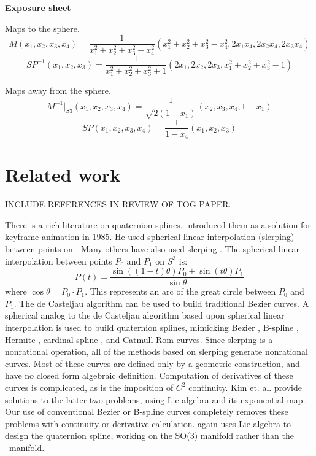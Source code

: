 \documentclass[11pt]{article}
\begin{document}
{\bf Exposure sheet}

Maps to the sphere.
\[
	M(x_1,x_2,x_3,x_4) =
	\frac{1}{x_1^2 + x_2^2 + x_3^2 + x_4^2}
	(x_1^2 + x_2^2 + x_3^2 - x_4^2, 2x_1x_4, 2x_2x_4, 2x_3x_4)
\]
\[
SP^{-1}(x_1,x_2,x_3) = \frac{1}{x_1^2 + x_2^2 + x_3^2 + 1} 
                       (2x_1, 2x_2, 2x_3, x_1^2+x_2^2+x_3^2 - 1)
\]

Maps away from the sphere.
\[
M^{-1}|_{S3}(x_1,x_2,x_3,x_4) = \frac{1}{\sqrt{2(1-x_1)}}(x_2,x_3,x_4,1-x_1)
\]
\[
SP(x_1,x_2,x_3,x_4) = \frac{1}{1-x_4} (x_1,x_2,x_3)
\]

\clearpage

\section{Related work}
\label{sec:prevwork}


INCLUDE REFERENCES IN REVIEW OF TOG PAPER.

There is a rich literature on quaternion splines.
\cite{shoemake85} introduced them as a solution 
for keyframe animation in 1985.
He used spherical linear interpolation (slerping) between points on .
Many others have also used slerping 
\cite{duff85,pletinckx89,schlag91,nielson92,nielson93,kim95,nam95}.
The spherical linear interpolation between points $P_0$ and $P_1$ on $S^3$ is:
\[ P(t) = \frac{\sin((1-t)\theta) P_0 + \sin(t \theta) P_1}{\sin \theta}
\]
where $\cos \theta = P_0 \cdot P_1$.
This represents an arc of the great circle between $P_0$ and $P_1$.
The de Casteljau algorithm can be used to build traditional Bezier curves.
A spherical analog to the de Casteljau algorithm based upon
spherical linear interpolation is used to build quaternion splines,
mimicking Bezier \cite{shoemake85,kim95}, B-spline 
\cite{duff85,nielson92,nielson93,kim95}, Hermite \cite{kim95,nam95},
cardinal spline \cite{pletinckx89}, and Catmull-Rom \cite{schlag91} curves.
Since slerping is a nonrational operation,
all of the methods based on slerping generate nonrational curves.
Most of these curves are defined only by a geometric construction, and have
no closed form algebraic definition.
Computation of derivatives of these curves is complicated,
as is the imposition of $C^2$ continuity.
Kim et. al. \cite{kim95} provide solutions to the latter two problems,
using Lie algebra and its exponential map.
Our use of conventional Bezier or B-spline curves completely removes 
these problems with continuity or derivative calculation.
\cite{park97} again uses Lie algebra to design the quaternion spline,
working on the SO(3) manifold rather than the \ manifold.
\end{document}
